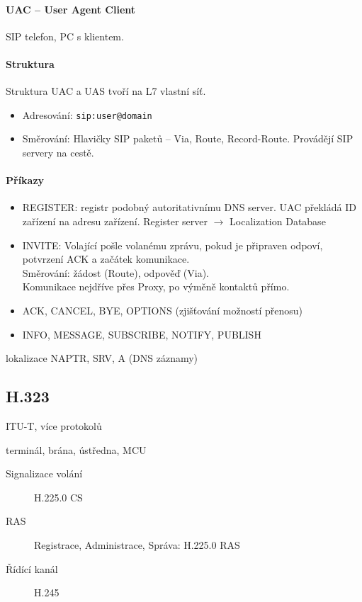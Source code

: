 \documentclass[a4wide]{report}
\begin{document}
\paragraph{UAC -- User Agent Client}
SIP telefon, PC s klientem.

\paragraph{Struktura}
Struktura UAC a UAS tvoří na L7 vlastní síť.
\begin{itemize}
	\item Adresování: \verb|sip:user@domain|
	\item Směrování: Hlavičky SIP paketů -- Via, Route, Record-Route. Provádějí SIP servery na cestě.
\end{itemize}

\paragraph{Příkazy}
\begin{itemize}
	\item REGISTER: registr podobný autoritativnímu DNS server. UAC překládá ID zařízení na adresu zařízení. Register server $\to$ Localization Database
	\item INVITE: Volající pošle volanému zprávu, pokud je připraven odpoví, potvrzení ACK a začátek komunikace.\\
		Směrování: žádost (Route), odpověď (Via).\\
		Komunikace nejdříve přes Proxy, po výměně kontaktů přímo.
	\item ACK, CANCEL, BYE, OPTIONS (zjišťování možností přenosu)
	\item INFO, MESSAGE, SUBSCRIBE, NOTIFY, PUBLISH
\end{itemize}

lokalizace NAPTR, SRV, A (DNS záznamy)

\subsection{H.323}
ITU-T, více protokolů

terminál, brána, ústředna, MCU

\begin{description}
	\item[Signalizace volání] H.225.0 CS
	\item[RAS] Registrace, Administrace, Správa: H.225.0 RAS
	\item[Řídící kanál] H.245
\end{description}
\end{document}
